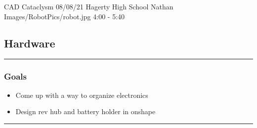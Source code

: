 \insertmeeting 
	{CAD Cataclysm} 
	{08/08/21}
	{Hagerty High School}
	{Nathan}
	{Images/RobotPics/robot.jpg}
	{4:00 - 5:40}
	
\subsection*{Hardware}
\noindent\hfil\rule{\textwidth}{.4pt}\hfil
\subsubsection*{Goals}
\begin{itemize}
    \item Come up with a way to organize electronics
    \item Design rev hub and battery holder in onshape
  

\end{itemize} 

\noindent\hfil\rule{\textwidth}{.4pt}\hfil

